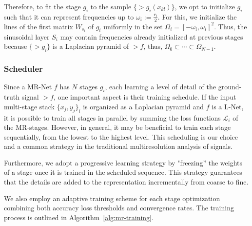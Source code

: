 Therefore, to fit the stage $g_i$ to the sample $\{\gt{g}_i(x_{kl})\}$, we opt to initialize $g_i$ such that it can represent frequencies up to $\omega_i:=\frac{r_i}{2}$.
For this, we initialize the lines of the first matrix $W_{s_i}$ of $g_i$ uniformly in the set $\Omega_i=\left[-\omega_i, \omega_i\right]^2$.
Thus, the sinusoidal layer $S_i$ may contain frequencies already initialized at previous stages because $\{\gt{g}_i\}$ is a Laplacian pyramid of $\gt{f}$, thus, $\Omega_0\subset \cdots \subset \Omega_{N-1}$. 

\subsubsection{Scheduler}

Since a MR-Net $f$ has $N$ stages $g_i$, each learning a level of detail of the ground-truth signal $\gt{f}$, one important aspect is their training schedule. 
If the input multi-stage stack $\{x_j, y_j\}_i$ is organized as a Laplacian pyramid and $f$ is a L-Net, it is possible to train all stages in parallel by summing the loss functions $\mathcal{L}_i$ of the MR-stages. However, in general, it may be beneficial to train each stage sequentially, from the lowest to the highest level. This scheduling is our choice and a common strategy in the traditional multiresolution analysis of signals.

Furthermore, we adopt a progressive learning strategy by "freezing” the weights of a stage once it is trained in the scheduled sequence. This strategy guarantees that the details are added to the representation incrementally from coarse to fine.

We also employ an adaptive training scheme for each stage optimization combining both accuracy loss thresholds and convergence rates. The training process is outlined in Algorithm~\ref{alg:mr-training}.

